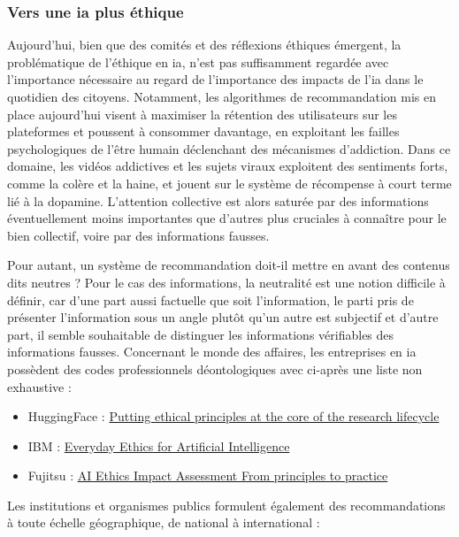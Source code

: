 \subsubsection{Vers une \gls{ia} plus éthique}

Aujourd'hui, bien que des comités et des réflexions éthiques émergent, la problématique de l'éthique en \gls{ia}, n'est pas suffisamment regardée avec l'importance nécessaire au regard de l'importance des impacts de l'\gls{ia} dans le quotidien des citoyens.
Notamment, les algorithmes de recommandation mis en place aujourd'hui visent à maximiser la rétention des utilisateurs sur les plateformes et poussent à consommer davantage, en exploitant les failles psychologiques de l'être humain déclenchant des mécanismes d'addiction. Dans ce domaine, les vidéos addictives et les sujets viraux exploitent des sentiments forts, comme la colère et la haine, et jouent sur le système de récompense à court terme lié à la dopamine. L'attention collective est alors saturée par des informations éventuellement moins importantes que d'autres plus cruciales à connaître pour le bien collectif, voire par des informations fausses.

Pour autant, un système de recommandation doit-il mettre en avant des contenus dits neutres ? Pour le cas des informations, la neutralité est une notion difficile à définir, car d'une part aussi factuelle que soit l'information, le parti pris de présenter l'information sous un angle plutôt qu'un autre est subjectif et d'autre part, il semble souhaitable de distinguer les informations vérifiables des informations fausses.
Concernant le monde des affaires, les entreprises en \gls{ia} possèdent des codes professionnels déontologiques avec ci-après une liste non exhaustive  : 

\begin{itemize}
    \item HuggingFace : \href{https://huggingface.co/blog/ethical-charter-multimodal}{Putting ethical principles at the core of the research lifecycle}
    \item IBM : \href{https://www.ibm.com/watson/assets/duo/pdf/everydayethics.pdf}{Everyday
Ethics
for Artificial
Intelligence}
    \item Fujitsu : \href{https://www.fujitsu.com/global/about/research/technology/aiethics/}{AI Ethics Impact
Assessment
From principles
to practice}
\end{itemize}

Les institutions et organismes publics formulent également des recommandations à toute échelle géographique, de national à international : 

